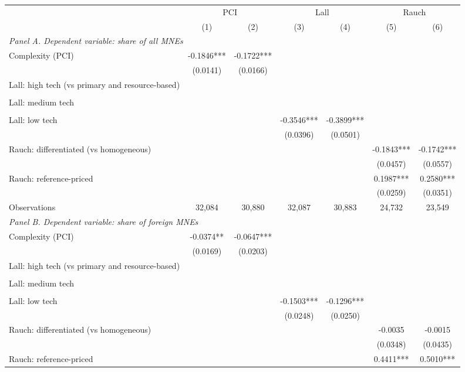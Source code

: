 \begin{tabular}{lcccccc} \hline
 & \multicolumn{2}{c}{PCI} & \multicolumn{2}{c}{Lall} & \multicolumn{2}{c}{Rauch} \\
 & (1) & (2) & (3) & (4) & (5) & (6) \\ \hline
\multicolumn{7}{l}{\textit{Panel A. Dependent variable: share of all MNEs}} \\
Complexity (PCI) & -0.1846*** & -0.1722*** &  &  &  &  \\
 & (0.0141) & (0.0166) &  &  &  &  \\
Lall: high tech (vs primary and resource-based) &  &  &  &  &  &  \\
 &  &  &  &  &  &  \\
Lall: medium tech &  &  &  &  &  &  \\
 &  &  &  &  &  &  \\
Lall: low tech &  &  & -0.3546*** & -0.3899*** &  &  \\
 &  &  & (0.0396) & (0.0501) &  &  \\
Rauch: differentiated (vs homogeneous) &  &  &  &  & -0.1843*** & -0.1742*** \\
 &  &  &  &  & (0.0457) & (0.0557) \\
Rauch: reference-priced &  &  &  &  & 0.1987*** & 0.2580*** \\
 &  &  &  &  & (0.0259) & (0.0351) \\
Observations & 32,084 & 30,880 & 32,087 & 30,883 & 24,732 & 23,549 \\
\midrule
\multicolumn{7}{l}{\textit{Panel B. Dependent variable: share of foreign MNEs}} \\
Complexity (PCI) & -0.0374** & -0.0647*** &  &  &  &  \\
 & (0.0169) & (0.0203) &  &  &  &  \\
Lall: high tech (vs primary and resource-based) &  &  &  &  &  &  \\
 &  &  &  &  &  &  \\
Lall: medium tech &  &  &  &  &  &  \\
 &  &  &  &  &  &  \\
Lall: low tech &  &  & -0.1503*** & -0.1296*** &  &  \\
 &  &  & (0.0248) & (0.0250) &  &  \\
Rauch: differentiated (vs homogeneous) &  &  &  &  & -0.0035 & -0.0015 \\
 &  &  &  &  & (0.0348) & (0.0435) \\
Rauch: reference-priced &  &  &  &  & 0.4411*** & 0.5010*** \\

\end{tabular}
